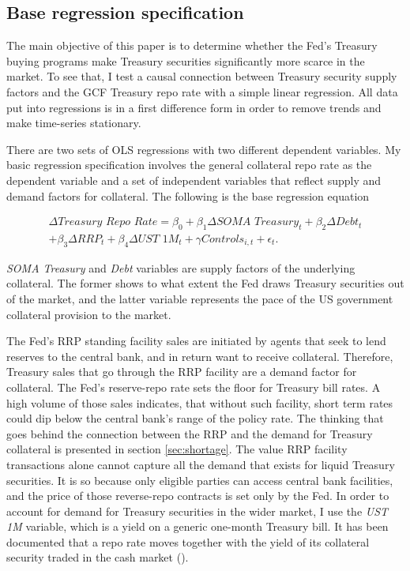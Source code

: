 \documentclass[11pt,a4paper,english,oneside]{article}
\begin{document}
\subsection{Base regression specification} \label{sec:base}

The main objective of this paper is to determine whether the Fed's Treasury buying programs make Treasury securities significantly more scarce in the market. To see that, I test a causal connection between Treasury security supply factors and the GCF Treasury repo rate with a simple linear regression. All data put into regressions is in a first difference form in order to remove trends and make time-series stationary.

There are two sets of OLS regressions with two different dependent variables. My basic regression specification involves the general collateral repo rate as the dependent variable and a set of independent variables that reflect supply and demand factors for collateral. The following is the base regression equation

\begin{equation} \label{eq:1}
  \begin{gathered}
  \Delta \textit{Treasury Repo Rate} = \beta_0 + \beta_1 \Delta \textit{SOMA Treasury}_t + \beta_2 \Delta \textit{Debt}_t \\ + \beta_3 \Delta \textit{RRP}_t  + \beta_4 \Delta \textit{UST 1M}_t + \gamma \textit{Controls}_{i,t} + \epsilon_{t}.
  \end{gathered}
\end{equation}

\emph{SOMA Treasury} and \emph{Debt} variables are supply factors of the underlying collateral. The former shows to what extent the Fed draws Treasury securities out of the market, and the latter variable represents the pace of the US government collateral provision to the market.

The Fed's RRP standing facility sales are initiated by agents that seek to lend reserves to the central bank, and in return want to receive collateral. Therefore, Treasury sales that go through the RRP facility are a demand factor for collateral. The Fed's reserve-repo rate sets the floor for Treasury bill rates. A high volume of those sales indicates, that without such facility, short term rates could dip below the central bank's range of the policy rate. The thinking that goes behind the connection between the RRP and the demand for Treasury collateral is presented in section \ref{sec:shortage}.
The value RRP facility transactions alone cannot capture all the demand that exists for liquid Treasury securities. It is so because only eligible parties can access central bank facilities, and the price of those reverse-repo contracts is set only by the Fed. In order to account for demand for Treasury securities in the wider market, I use the \emph{UST 1M} variable, which is a yield on a generic one-month Treasury bill. It has been documented that a repo rate moves together with the yield of its collateral security traded in the cash market (\citealp{bartolini2011,nyborg2019a}).
\end{document}
